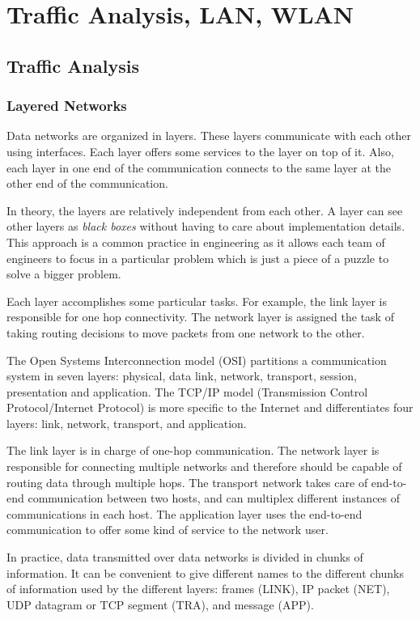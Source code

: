 \chapter{Traffic Analysis, LAN, WLAN}

\section{Traffic Analysis}

\subsection{Layered Networks}
Data networks are organized in layers.
These layers communicate with each other using interfaces.
Each layer offers some services to the layer on top of it.
Also, each layer in one end of the communication connects to the same layer at the other end of the communication.

In theory, the layers are relatively independent from each other.
A layer can see other layers as \emph{black boxes} without having to care about implementation details.
This approach is a common practice in engineering as it allows each team of engineers to focus in a particular problem which is just a piece of a puzzle to solve a bigger problem.

Each layer accomplishes some particular tasks.
For example, the link layer is responsible for one hop connectivity.
The network layer is assigned the task of taking routing decisions to move packets from one network to the other.

The Open Systems Interconnection model (OSI) partitions a communication system in seven layers: physical, data link, network, transport, session, presentation and application.
The TCP/IP model (Transmission Control Protocol/Internet Protocol) is more specific to the Internet and differentiates four layers: link, network, transport, and application.

The link layer is in charge of one-hop communication.
The network layer is responsible for connecting multiple networks and therefore should be capable of routing data through multiple hops.
The transport network takes care of end-to-end communication between two hosts, and can multiplex different instances of communications in each host.
The application layer uses the end-to-end communication to offer some kind of service to the network user.

In practice, data transmitted over data networks is divided in chunks of information.
It can be convenient to give different names to the different chunks of information used by the different layers: frames (LINK), IP packet (NET), UDP datagram or TCP segment (TRA), and message (APP).

